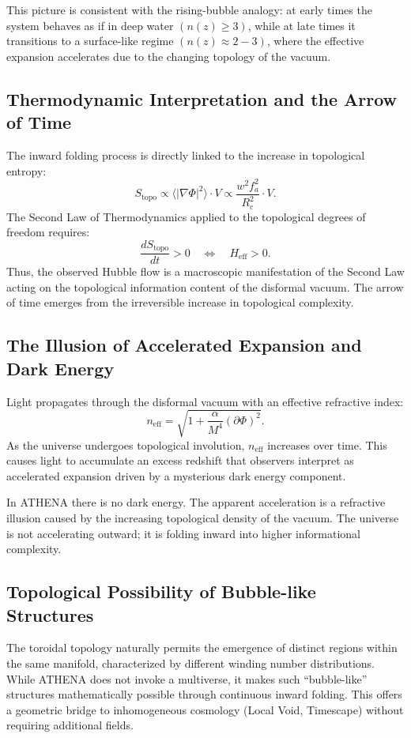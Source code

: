 \documentclass[11pt,a4paper]{article}
\begin{document}
This picture is consistent with the rising-bubble analogy: at early times the system behaves as if in deep water \((n(z)\geq 3)\), while at late times it transitions to a surface-like regime \((n(z)\approx 2 - 3)\), where the effective expansion accelerates due to the changing topology of the vacuum.

\subsection{Thermodynamic Interpretation and the Arrow of Time}
The inward folding process is directly linked to the increase in topological entropy:
\begin{equation}
S_{\mathrm{topo}}\propto \langle |\nabla \Phi |^2\rangle \cdot V\propto \frac{w^2f_a^2}{R_c^2}\cdot V. \tag{55}
\end{equation}
The Second Law of Thermodynamics applied to the topological degrees of freedom requires:
\begin{equation}
\frac{dS_{\mathrm{topo}}}{dt} >0\quad \Longleftrightarrow \quad H_{\mathrm{eff}} > 0. \tag{56}
\end{equation}
Thus, the observed Hubble flow is a macroscopic manifestation of the Second Law acting on the topological information content of the disformal vacuum. The arrow of time emerges from the irreversible increase in topological complexity.

\subsection{The Illusion of Accelerated Expansion and Dark Energy}
Light propagates through the disformal vacuum with an effective refractive index:
\begin{equation}
n_{\mathrm{eff}} = \sqrt{1 + \frac{\alpha}{M^4} (\partial \Phi)^2}. \tag{57}
\end{equation}
As the universe undergoes topological involution, \(n_{\mathrm{eff}}\) increases over time. This causes light to accumulate an excess redshift that observers interpret as accelerated expansion driven by a mysterious dark energy component.

In ATHENA there is no dark energy. The apparent acceleration is a refractive illusion caused by the increasing topological density of the vacuum. The universe is not accelerating outward; it is folding inward into higher informational complexity.

\subsection{Topological Possibility of Bubble-like Structures}
The toroidal topology naturally permits the emergence of distinct regions within the same manifold, characterized by different winding number distributions. While ATHENA does not invoke a multiverse, it makes such ``bubble-like'' structures mathematically possible through continuous inward folding. This offers a geometric bridge to inhomogeneous cosmology (Local Void, Timescape) without requiring additional fields.
\end{document}
